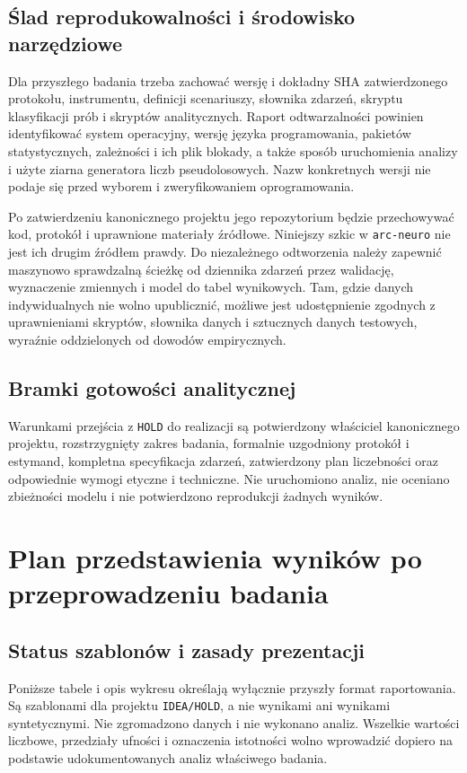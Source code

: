 \documentclass[11pt,a4paper]{article}
\begin{document}
\subsection{Ślad reprodukowalności i środowisko narzędziowe}
Dla przyszłego badania trzeba zachować wersję i dokładny SHA zatwierdzonego protokołu, instrumentu, definicji scenariuszy, słownika zdarzeń, skryptu klasyfikacji prób i skryptów analitycznych. Raport odtwarzalności powinien identyfikować system operacyjny, wersję języka programowania, pakietów statystycznych, zależności i ich plik blokady, a także sposób uruchomienia analizy i użyte ziarna generatora liczb pseudolosowych. Nazw konkretnych wersji nie podaje się przed wyborem i zweryfikowaniem oprogramowania.

Po zatwierdzeniu kanonicznego projektu jego repozytorium będzie przechowywać kod, protokół i uprawnione materiały źródłowe. Niniejszy szkic w \texttt{arc-neuro} nie jest ich drugim źródłem prawdy. Do niezależnego odtworzenia należy zapewnić maszynowo sprawdzalną ścieżkę od dziennika zdarzeń przez walidację, wyznaczenie zmiennych i model do tabel wynikowych. Tam, gdzie danych indywidualnych nie wolno upublicznić, możliwe jest udostępnienie zgodnych z uprawnieniami skryptów, słownika danych i sztucznych danych testowych, wyraźnie oddzielonych od dowodów empirycznych.

\subsection{Bramki gotowości analitycznej}
Warunkami przejścia z \texttt{HOLD} do realizacji są potwierdzony właściciel kanonicznego projektu, rozstrzygnięty zakres badania, formalnie uzgodniony protokół i estymand, kompletna specyfikacja zdarzeń, zatwierdzony plan liczebności oraz odpowiednie wymogi etyczne i techniczne. Nie uruchomiono analiz, nie oceniano zbieżności modelu i nie potwierdzono reprodukcji żadnych wyników.

\section{Plan przedstawienia wyników po przeprowadzeniu badania}
\subsection{Status szablonów i zasady prezentacji}
Poniższe tabele i opis wykresu określają wyłącznie przyszły format raportowania. Są szablonami dla projektu \texttt{IDEA/HOLD}, a nie wynikami ani wynikami syntetycznymi. Nie zgromadzono danych i nie wykonano analiz. Wszelkie wartości liczbowe, przedziały ufności i oznaczenia istotności wolno wprowadzić dopiero na podstawie udokumentowanych analiz właściwego badania.
\end{document}
